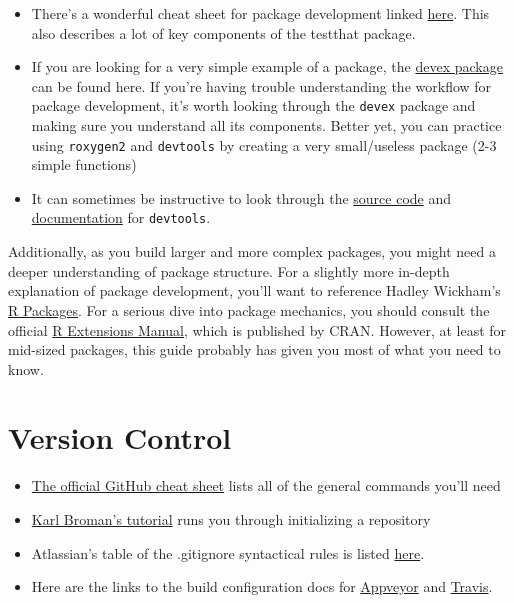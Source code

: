 \documentclass[
]{book}
\providecommand{\tightlist}{%
  \setlength{\itemsep}{0pt}\setlength{\parskip}{0pt}}
\begin{document}
\begin{itemize}
\item
  There's a wonderful cheat sheet for package development linked \href{https://www.rstudio.com/wp-content/uploads/2015/06/devtools-cheatsheet.pdf}{here}. This also describes a lot of key components of the testthat package.
\item
  If you are looking for a very simple example of a package, the \href{https://github.com/IQSS/Rbuild/tree/master/devex}{devex package} can be found here. If you're having trouble understanding the workflow for package development, it's worth looking through the \texttt{devex} package and making sure you understand all its components. Better yet, you can practice using \texttt{roxygen2} and \texttt{devtools} by creating a very small/useless package (2-3 simple functions)
\item
  It can sometimes be instructive to look through the \href{https://www.rdocumentation.org/packages/devtools/versions/1.13.3/source}{source code} and \href{https://www.rdocumentation.org/packages/devtools/versions/1.13.3}{documentation} for \texttt{devtools}.
\end{itemize}

Additionally, as you build larger and more complex packages, you might need a deeper understanding of package structure. For a slightly more in-depth explanation of package development, you'll want to reference Hadley Wickham's \href{http://r-pkgs.had.co.nz/}{R Packages}. For a serious dive into package mechanics, you should consult the official \href{https://cran.r-project.org/doc/manuals/R-exts.html\#Creating-R-packages}{R Extensions Manual}, which is published by CRAN. However, at least for mid-sized packages, this guide probably has given you most of what you need to know.

\hypertarget{version-control}{%
\section{Version Control}\label{version-control}}

\begin{itemize}
\tightlist
\item
  \href{https://github.github.com/training-kit/downloads/github-git-cheat-sheet.pdf}{The official GitHub cheat sheet} lists all of the general commands you'll need
\item
  \href{http://kbroman.org/github_tutorial/pages/init.html}{Karl Broman's tutorial} runs you through initializing a repository
\item
  Atlassian's table of the .gitignore syntactical rules is listed \href{https://www.atlassian.com/git/tutorials/gitignore}{here}.
\item
  Here are the links to the build configuration docs for \href{https://www.appveyor.com/docs/build-configuration/}{Appveyor} and \href{https://docs.travis-ci.com/user/languages/r/}{Travis}.
\end{itemize}
\end{document}
